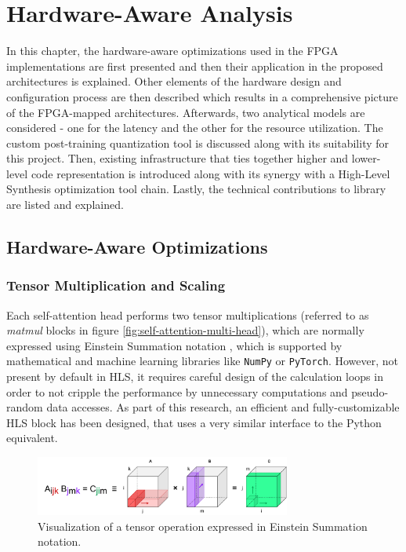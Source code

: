 \chapter{Hardware-Aware Analysis}\label{quantization}
In this chapter, the hardware-aware optimizations used in the FPGA implementations are first presented and then their application in the proposed architectures is explained. Other elements of the hardware design and configuration process are then described which results in a comprehensive picture of the FPGA-mapped architectures. Afterwards, two analytical models are considered - one for the latency and the other for the resource utilization. The custom post-training quantization tool is discussed along with its suitability for this project. Then, existing infrastructure that ties together higher and lower-level code representation is introduced along with its synergy with a High-Level Synthesis optimization tool chain. Lastly, the technical contributions to \hlsml library are listed and explained.

\section{Hardware-Aware Optimizations}

\subsection{Tensor Multiplication and Scaling}\label{tensor-multiplication}
Each self-attention head performs two tensor multiplications (referred to as \textit{matmul} blocks in figure \ref{fig:self-attention-multi-head}), which are normally expressed using Einstein Summation notation \cite{59-barr1991einstein}, which is supported by mathematical and machine learning libraries like \texttt{NumPy} or \texttt{PyTorch}. However, not present by default in HLS, it requires careful design of the calculation loops in order to not cripple the performance by unnecessary computations and pseudo-random data accesses. As part of this research, an efficient and fully-customizable HLS block has been designed, that uses a very similar interface to the Python equivalent.

\begin{figure}[hpt!]
  \centering
  \includegraphics[trim={0cm 0cm 0cm 0cm}, width=0.75\textwidth, center]{models/einsum.pdf}
  \caption{Visualization of a tensor operation expressed in Einstein Summation notation.}
  \label{fig:einsum}
\end{figure}

